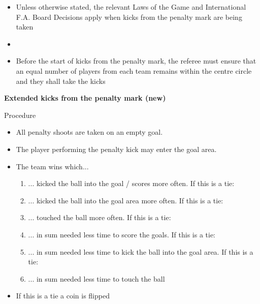 \begin{itemize}
\item Unless otherwise stated, the relevant Laws of the Game and International F.A. Board Decisions apply when kicks from the penalty mark are being taken
\item {}
\item Before the start of kicks from the penalty mark, the referee must ensure that an equal number of players from each team remains within the centre circle and they shall take the kicks
\end{itemize}


{\bfseries Extended kicks from the penalty mark (new) }

\bigskip

Procedure

\headlinebox

\begin{itemize}
\item All penalty shoots are taken on an empty goal.
\item The player performing the penalty kick may enter the goal area.
\item The team wins which...
\begin{enumerate}
\item ... kicked the ball into the goal / scores more often. If this is a tie:
\item ... kicked the ball into the goal area more often. If this is a tie:
\item ... touched the ball more often. If this is a tie:
\item ... in sum needed less time to score the goals. If this is a tie:
\item ... in sum needed less time to kick the ball into the goal area. If this is a tie:
\item ... in sum needed less time to touch the ball
\end{enumerate}
\item If this is a tie a coin is flipped
\end{itemize}
